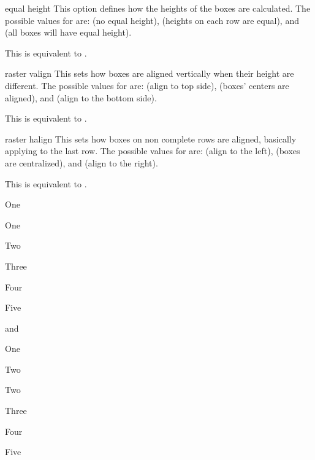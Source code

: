 \documentclass[a4paper, 11pt]{article}
\begin{document}
\begin{optiondef}{equal height}{}{}
    This option defines how the heights of the boxes are calculated. The possible values for  are:  (no equal height),  (heights on each row are equal), and  (all boxes will have equal height).

    This is equivalent to .
\end{optiondef}

\begin{optiondef}{raster valign}{}{}
    This sets how boxes are aligned vertically when their height are different. The possible values for  are:  (align to top side),  (boxes' centers are aligned), and  (align to the bottom side).

    This is equivalent to .
\end{optiondef}

\begin{optiondef}{raster halign}{}{}
    This sets how boxes on non complete rows are aligned, basically applying to the last row. The possible values for  are:  (align to the left),  (boxes are centralized), and  (align to the right).

    This is equivalent to .
\end{optiondef}

\begin{example}{}
    \begin{PLTBoxRaster}[width = 5cm, columns = 2, raster halign = right]
        \item One\par One
        \item Two
        \item Three
        \item Four
        \item Five
    \end{PLTBoxRaster}\quad and\quad
    \begin{PLTBoxRaster}[width = 3cm, columns = 1, equal height = all]
        \item One
        \item Two\par Two
        \item Three
        \item Four
        \item Five
    \end{PLTBoxRaster}
\end{example}
\end{document}

